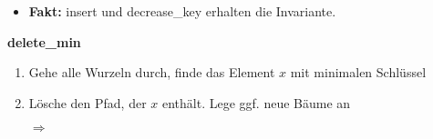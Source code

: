 \begin{itemize}
\begin{itemize}
      \item \textbf{Fakt:} insert und decrease\_key erhalten die Invariante.
     \end{itemize}
     \textbf{delete\_min}
     \begin{enumerate}
      \item Gehe alle Wurzeln durch, finde das Element $x$ mit minimalen Schlüssel
      \item Lösche den Pfad, der $x$ enthält. Lege ggf. neue Bäume an
      \begin{center}
      \begin{minipage}{6cm}
        \centering
       \end{minipage}
       \hspace{0.2cm}
       $\Rightarrow$
       \hspace{0.2cm}
       \begin{minipage}{6cm}
        \centering
\end{minipage}
\end{center}
\end{enumerate}
\end{itemize}
